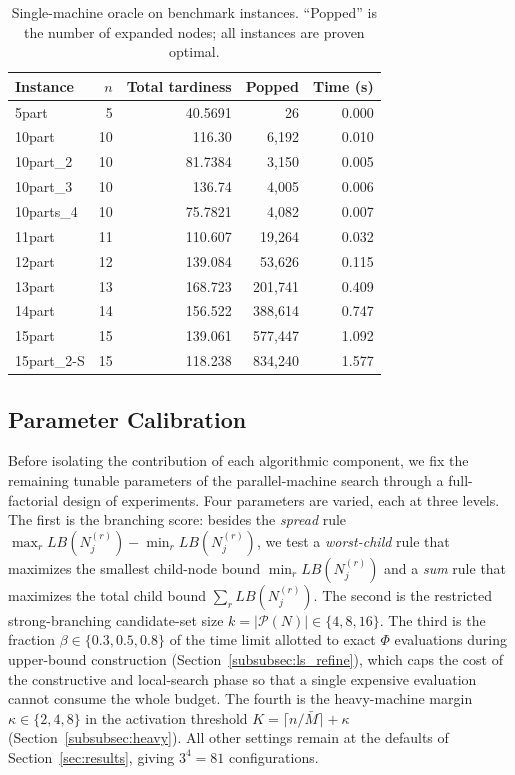 \documentclass[review,3p,times,authoryear]{elsarticle}
\begin{document}
\begin{table}[t]
	\centering
	\caption{Single-machine oracle on benchmark instances. ``Popped'' is the number
		of expanded nodes; all instances are proven optimal.}
	\label{tab:single}
	\begin{tabular}{l r r r r}
		\toprule
		Instance & $n$ & Total tardiness & Popped & Time (s) \\
		\midrule
		5part      & 5  & 40.5691  & 26        & 0.000 \\
		10part     & 10 & 116.30   & 6{,}192   & 0.010 \\
		10part\_2  & 10 & 81.7384  & 3{,}150   & 0.005 \\
		10part\_3  & 10 & 136.74   & 4{,}005   & 0.006 \\
		10parts\_4 & 10 & 75.7821  & 4{,}082   & 0.007 \\
		11part     & 11 & 110.607  & 19{,}264  & 0.032 \\
		12part     & 12 & 139.084  & 53{,}626  & 0.115 \\
		13part     & 13 & 168.723  & 201{,}741 & 0.409 \\
		14part     & 14 & 156.522  & 388{,}614 & 0.747 \\
		15part     & 15 & 139.061  & 577{,}447 & 1.092 \\
		15part\_2-S& 15 & 118.238  & 834{,}240 & 1.577 \\
		\bottomrule
	\end{tabular}
\end{table}

\subsection{Parameter Calibration}
\label{subsec:calib}

Before isolating the contribution of each algorithmic component, we fix the
remaining tunable parameters of the parallel-machine search through a
full-factorial design of experiments. Four parameters are varied, each at three
levels. The first is the branching score: besides the \emph{spread} rule
$\max_{r}LB(N_j^{(r)})-\min_{r}LB(N_j^{(r)})$, we test a \emph{worst-child} rule
that maximizes the smallest child-node bound $\min_{r}LB(N_j^{(r)})$ and a
\emph{sum} rule that maximizes the total child bound $\sum_{r}LB(N_j^{(r)})$. The
second is the restricted strong-branching candidate-set size
$k=|\mathcal{P}(N)|\in\{4,8,16\}$. The third is the fraction
$\beta\in\{0.3,0.5,0.8\}$ of the time limit allotted to exact $\Phi$ evaluations
during upper-bound construction (Section~\ref{subsubsec:ls_refine}), which caps
the cost of the constructive and local-search phase so that a single expensive
evaluation cannot consume the whole budget. The fourth is the heavy-machine
margin $\kappa\in\{2,4,8\}$ in the activation threshold
$K=\lceil n/\bar M\rceil+\kappa$ (Section~\ref{subsubsec:heavy}). All other
settings remain at the defaults of Section~\ref{sec:results}, giving $3^4=81$
configurations.
\end{document}
